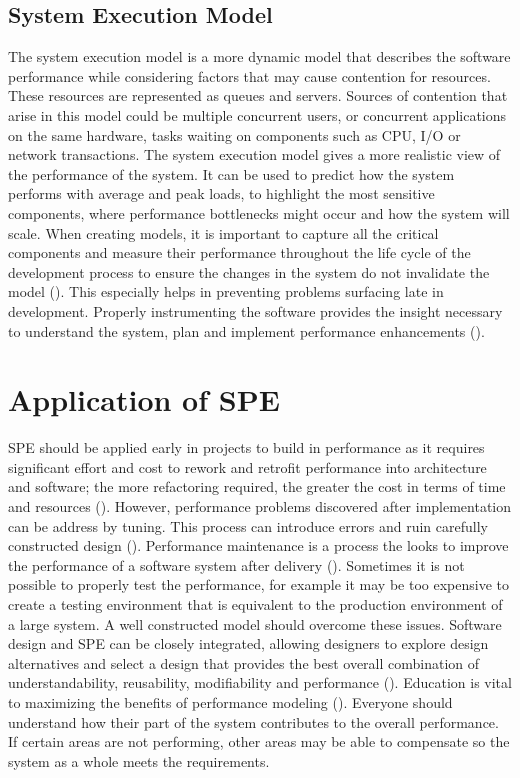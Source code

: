 \documentclass[a4paper,11pt,article,oneside]{memoir}
\begin{document}
	\subsection{System Execution Model}
	The system execution model is a more dynamic model that describes the software performance while considering factors that may cause contention for resources. These resources are represented as queues and servers. Sources of contention that arise in this model could be multiple concurrent users, or concurrent applications on the same hardware, tasks waiting on components such as CPU, I/O or network transactions. The system execution model gives a more realistic view of the performance of the system. It can be used to predict how the system performs with average and peak loads, to highlight the most sensitive components, where performance bottlenecks might occur and how the system will scale. 
	When creating models, it is important to capture all the critical components and measure their performance throughout the life cycle of the development process to ensure the changes in the system do not invalidate the model (\cite{smith2003best}). This especially helps in preventing problems surfacing late in development. Properly instrumenting the software provides the insight necessary to understand the system, plan and implement performance enhancements (\cite{chauhan2014atlas}).
	\section{Application of SPE}
	SPE should be applied early in projects to build in performance as it requires significant effort and cost to rework and retrofit performance into architecture and software; the more refactoring required, the greater the cost in terms of time and resources (\cite{smith2003best}). However, performance problems discovered after implementation can be address by tuning. This process can introduce errors and ruin carefully constructed design (\cite{williams1995information}). Performance maintenance is a process the looks to improve the performance of a software system after delivery (\cite{bezemer2014performance}). Sometimes it is not possible to properly test the performance, for example it may be too expensive to create a testing environment that is equivalent to the production environment of a large system. A well constructed model should overcome these issues.
	Software design and SPE can be closely integrated, allowing designers to explore design alternatives and select a design that provides the best overall combination of understandability, reusability, modifiability and performance (\cite{williams1995information}). Education is vital to maximizing the benefits of performance modeling (\cite{smith2002performance}). Everyone should understand how their part of the system contributes to the overall performance. If certain areas are not performing, other areas may be able to compensate so the system as a whole meets the requirements. 
	
\end{document}
